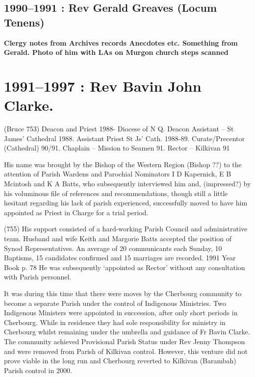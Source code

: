 \hypertarget{rev-gerald-greaves-locum-tenens}{%
\section{1990--1991 : Rev Gerald Greaves (Locum
Tenens)}\label{rev-gerald-greaves-locum-tenens}}

\textbf{Clergy notes from Archives records Anecdotes etc. Something from
Gerald. Photo of him with LAs on Murgon church steps scanned}

\hypertarget{rev-bavin-john-clarke.}{%
\chapter{1991--1997 : Rev Bavin John
Clarke.}\label{rev-bavin-john-clarke.}}

(Bruce 753) Deacon and Priest 1988- Diocese of N Q. Deacon Assistant --
St James' Cathedral 1988. Assistant Priest St Js' Cath. 1988-89.
Curate/Precentor (Cathedral) 90/91. Chaplain -- Mission to Seamen 91.
Rector -- Kilkivan 91

His name was brought by the Bishop of the Western Region (Bishop ??) to
the attention of Parish Wardens and Parochial Nominators I D Kapernick,
E B Mcintosh and K A Batts, who subsequently interviewed him and,
(impressed?) by his voluminous file of references and recommendations,
though still a little hesitant regarding his lack of parish experienced,
successfully moved to have him appointed as Priest in Charge for a trial
period.

(755) His support consisted of a hard-working Parish Council and
administrative team. Husband and wife Keith and Margorie Batts accepted
the position of Synod Representatives. An average of 20 communicants
each Sunday, 10 Baptisms, 15 candidates confirmed and 15 marriages are
recorded. 1991 Year Book p. 78 He was subsequently `appointed as Rector'
without any consultation with Parish personnel.

It was during this time that there were moves by the Cherbourg community
to become a separate Parish under the control of Indigenous Ministries.
Two Indigenous Ministers were appointed in succession, after only short
periods in Cherbourg. While in residence they had sole responsibility
for ministry in Cherbourg whilst remaining under the umbrella and
guidance of Fr Bavin Clarke. The community achieved Provisional Parish
Status under Rev Jenny Thompson and were removed from Parish of Kilkivan
control. However, this venture did not prove viable in the long run and
Cherbourg reverted to Kilkivan (Barambah) Parish control in 2000.

